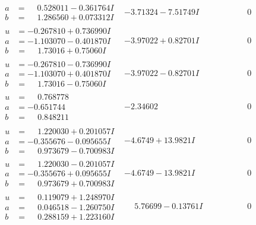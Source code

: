 \documentclass[1p]{elsarticle_modified}
\theoremstyle{definition}
\begin{document}
$$\begin{array}{c|c|c}
\begin{aligned}
a &= \phantom{-}0.528011 - 0.361764 I \\
b &= \phantom{-}1.286560 + 0.073312 I\end{aligned}
 & -3.71324 - 7.51749 I & \phantom{-0.000000 } 0 \\ \hline\begin{aligned}
u &= -0.267810 + 0.736990 I \\
a &= -1.103070 - 0.401870 I \\
b &= \phantom{-}1.73016 + 0.75060 I\end{aligned}
 & -3.97022 + 0.82701 I & \phantom{-0.000000 } 0 \\ \hline\begin{aligned}
u &= -0.267810 - 0.736990 I \\
a &= -1.103070 + 0.401870 I \\
b &= \phantom{-}1.73016 - 0.75060 I\end{aligned}
 & -3.97022 - 0.82701 I & \phantom{-0.000000 } 0 \\ \hline\begin{aligned}
u &= \phantom{-}0.768778\phantom{ +0.000000I} \\
a &= -0.651744\phantom{ +0.000000I} \\
b &= \phantom{-}0.848211\phantom{ +0.000000I}\end{aligned}
 & -2.34602\phantom{ +0.000000I} & \phantom{-0.000000 } 0 \\ \hline\begin{aligned}
u &= \phantom{-}1.220030 + 0.201057 I \\
a &= -0.355676 - 0.095655 I \\
b &= \phantom{-}0.973679 - 0.700983 I\end{aligned}
 & -4.6749 + 13.9821 I & \phantom{-0.000000 } 0 \\ \hline\begin{aligned}
u &= \phantom{-}1.220030 - 0.201057 I \\
a &= -0.355676 + 0.095655 I \\
b &= \phantom{-}0.973679 + 0.700983 I\end{aligned}
 & -4.6749 - 13.9821 I & \phantom{-0.000000 } 0 \\ \hline\begin{aligned}
u &= \phantom{-}0.119079 + 1.248970 I \\
a &= \phantom{-}0.046518 - 1.260750 I \\
b &= \phantom{-}0.288159 + 1.223160 I\end{aligned}
 & \phantom{-}5.76699 - 0.13761 I & \phantom{-0.000000 } 0 \\ \hline\begin{aligned}

\end{aligned}
\end{array}$$
\end{document}
